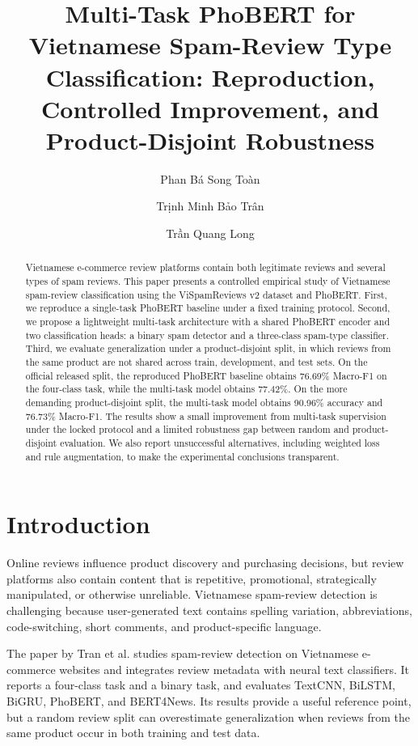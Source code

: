 \documentclass[runningheads]{llncs}
\title{Multi-Task PhoBERT for Vietnamese Spam-Review Type Classification:
Reproduction, Controlled Improvement, and Product-Disjoint Robustness}
\author{Phan Bá Song Toàn\inst{1} \and
Trịnh Minh Bảo Trân\inst{1} \and
Trần Quang Long\inst{1}}
\institute{TMG301 Text Mining, Vietnam}
\begin{document}
\maketitle

\begin{abstract}
Vietnamese e-commerce review platforms contain both legitimate reviews and several types of spam reviews. This paper presents a controlled empirical study of Vietnamese spam-review classification using the ViSpamReviews v2 dataset and PhoBERT. First, we reproduce a single-task PhoBERT baseline under a fixed training protocol. Second, we propose a lightweight multi-task architecture with a shared PhoBERT encoder and two classification heads: a binary spam detector and a three-class spam-type classifier. Third, we evaluate generalization under a product-disjoint split, in which reviews from the same product are not shared across train, development, and test sets. On the official released split, the reproduced PhoBERT baseline obtains 76.69\% Macro-F1 on the four-class task, while the multi-task model obtains 77.42\%. On the more demanding product-disjoint split, the multi-task model obtains 90.96\% accuracy and 76.73\% Macro-F1. The results show a small improvement from multi-task supervision under the locked protocol and a limited robustness gap between random and product-disjoint evaluation. We also report unsuccessful alternatives, including weighted loss and rule augmentation, to make the experimental conclusions transparent.
\end{abstract}


\section{Introduction}
Online reviews influence product discovery and purchasing decisions, but review platforms also contain content that is repetitive, promotional, strategically manipulated, or otherwise unreliable. Vietnamese spam-review detection is challenging because user-generated text contains spelling variation, abbreviations, code-switching, short comments, and product-specific language.

The paper by Tran et al.\cite{originalpaper} studies spam-review detection on Vietnamese e-commerce websites and integrates review metadata with neural text classifiers. It reports a four-class task and a binary task, and evaluates TextCNN, BiLSTM, BiGRU, PhoBERT, and BERT4News. Its results provide a useful reference point, but a random review split can overestimate generalization when reviews from the same product occur in both training and test data.
\end{document}
